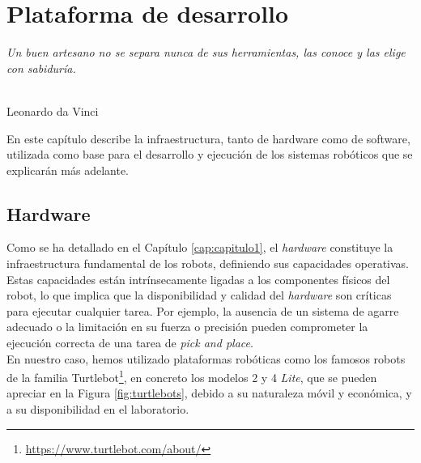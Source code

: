 \chapter{Plataforma de desarrollo}
\label{cap:capitulo3}

\begin{flushright}
\begin{minipage}[]{10cm}
\emph{Un buen artesano no se separa nunca de sus herramientas, las conoce y las elige con sabiduría.}\\
\end{minipage}\\

Leonardo da Vinci\\
\end{flushright}

\vspace{1cm}


En este capítulo describe la infraestructura, tanto de hardware como de
software, utilizada como base para el desarrollo y ejecución de los sistemas
robóticos que se explicarán más adelante.

\section{Hardware}
\label{sec:hardware}

Como se ha detallado en el Capítulo \ref{cap:capitulo1}, el \textit{hardware}
constituye la infraestructura fundamental de los robots, definiendo sus
capacidades operativas.
Estas capacidades están intrínsecamente ligadas a los componentes físicos del
robot, lo que implica que la disponibilidad y calidad del \textit{hardware} son
críticas para ejecutar cualquier tarea.
Por ejemplo, la ausencia de un sistema de agarre adecuado o la limitación en su
fuerza o precisión pueden comprometer la ejecución correcta de una tarea de
\textit{pick and place}.
\\

En nuestro caso, hemos utilizado plataformas robóticas como los famosos robots
de la familia Turtlebot\footnote{
\href{https://www.turtlebot.com/about/}{https://www.turtlebot.com/about/}}, en
concreto los modelos 2 y 4 \textit{Lite}, que se pueden apreciar en la Figura
\ref{fig:turtlebots}, debido a su naturaleza móvil y económica, y a su
disponibilidad en el laboratorio.
\\

